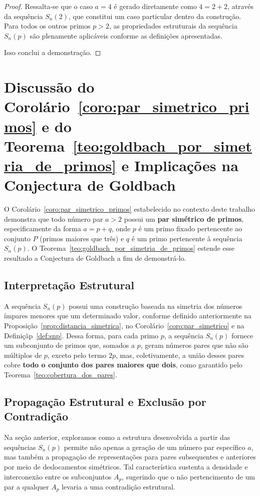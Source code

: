 \documentclass[a4paper,11pt]{article}
\theoremstyle{definition}
\theoremstyle{remark}
\begin{document}
\begin{otherlanguage}{brazil}
\begin{proof}
	Ressalta-se que o caso \(a = 4\) é gerado diretamente como \(4 = 2 + 2\), através da sequência \(S_n(2)\), que constitui um caso particular dentro da construção. Para todos os outros primos \(p > 2\), as propriedades estruturais da sequência \(S_n(p)\) são plenamente aplicáveis conforme as definições apresentadas.
	
	Isso conclui a demonstração.
	\end{proof}
	
	
	\section{Discussão do Corolário~\ref{coro:par_simetrico_primos} e do Teorema~\ref{teo:goldbach_por_simetria_de_primos} e Implicações na Conjectura de Goldbach}
	
	
	O Corolário~\ref{coro:par_simetrico_primos} estabelecido no contexto deste trabalho demonstra que todo número par \(a > 2\) possui um \textbf{par simétrico de primos}, especificamente da forma \(a = p + q\), onde \(p\) é um primo fixado pertencente ao conjunto \(P\) (primos maiores que três) e \(q\) é um primo pertencente à sequência \(S_n(p)\). O Teorema~\ref{teo:goldbach_por_simetria_de_primos} estende esse resultado a Conjectura de Goldbach a fim de demonstrá-lo. 
	
	\subsection{Interpretação Estrutural}
	A sequência \(S_n(p)\) possui uma construção baseada na simetria dos números ímpares menores que um determinado valor, conforme definido anteriormente na Proposição~\ref{prop:distancia_simetrica}, no Corolário~\ref{coro:par_simetrico} e na Definiçãp~\ref{def:snp}. Dessa forma, para cada primo \(p\), a sequência \(S_n(p)\) fornece um subconjunto de primos que, somados a \(p\), geram números pares que não são múltiplos de  \(p\), exceto pelo termo  \(2p\), mas, coletivamente, a união desses pares cobre \textbf{todo o conjunto dos pares maiores que dois}, como garantido pelo Teorema~\ref{teo:cobertura_dos_pares}.
	
	\subsection{Propagação Estrutural e Exclusão por Contradição}
	
	Na seção anterior, exploramos como a estrutura desenvolvida a partir das sequências \(S_n(p)\) permite não apenas a geração de um número par específico \(a\), mas também a propagação de representações para pares subsequentes e anteriores por meio de deslocamentos simétricos. Tal característica sustenta a densidade e interconexão entre os subconjuntos \(A_p\), sugerindo que o não pertencimento de um par a qualquer \(A_p\) levaria a uma contradição estrutural.
	

\end{otherlanguage}
\end{document}
